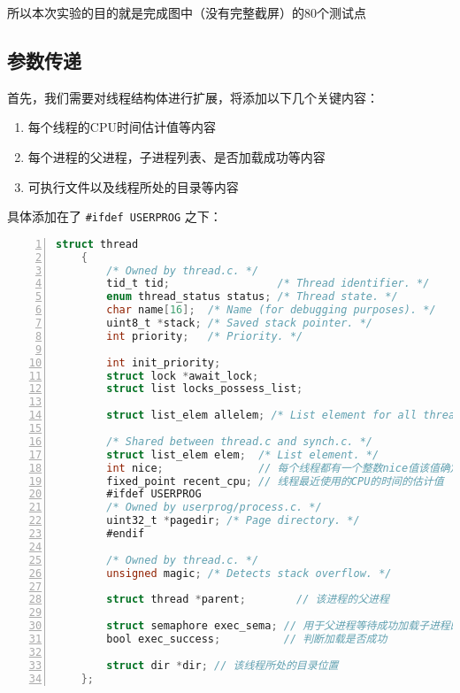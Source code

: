 \documentclass{article}
\begin{document}
	所以本次实验的目的就是完成图中（没有完整截屏）的80个测试点
	
	\subsection{参数传递}
	
	首先，我们需要对线程结构体进行扩展，将添加以下几个关键内容：
	
	\begin{enumerate}
		\item 每个线程的CPU时间估计值等内容
		\item 每个进程的父进程，子进程列表、是否加载成功等内容
		\item 可执行文件以及线程所处的目录等内容
	\end{enumerate}
	
	具体添加在了 \texttt{\#ifdef USERPROG} 之下：
	
	\begin{lstlisting}[xleftmargin = 4em,xrightmargin = 4em, aboveskip = 1em, numbers = left, language = C,title=src/threads/thread.h中的结构体]
    struct thread
    {
    	/* Owned by thread.c. */
    	tid_t tid;                 /* Thread identifier. */
    	enum thread_status status; /* Thread state. */
    	char name[16];  /* Name (for debugging purposes). */
    	uint8_t *stack; /* Saved stack pointer. */
    	int priority;   /* Priority. */
    	
    	int init_priority;
    	struct lock *await_lock;
    	struct list locks_possess_list;
    	
    	struct list_elem allelem; /* List element for all threads list. */
    	
    	/* Shared between thread.c and synch.c. */
    	struct list_elem elem;  /* List element. */
    	int nice;               // 每个线程都有一个整数nice值该值确定该线程与其他线程应该有多“不错”[-20,20]
    	fixed_point recent_cpu; // 线程最近使用的CPU的时间的估计值
    	#ifdef USERPROG
    	/* Owned by userprog/process.c. */
    	uint32_t *pagedir; /* Page directory. */
    	#endif
    	
    	/* Owned by thread.c. */
    	unsigned magic; /* Detects stack overflow. */
    	
    	struct thread *parent;        // 该进程的父进程
    	
    	struct semaphore exec_sema; // 用于父进程等待成功加载子进程的可执行文件时的阻塞
    	bool exec_success;          // 判断加载是否成功
    	
    	struct dir *dir; // 该线程所处的目录位置
    };
	\end{lstlisting}
	
\end{document}
